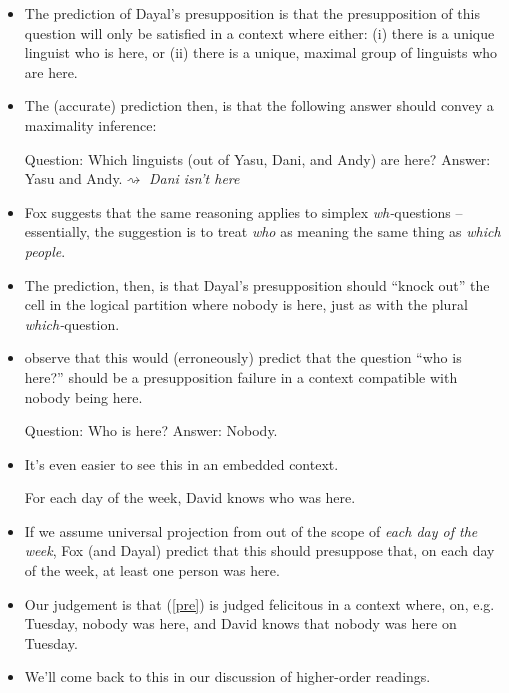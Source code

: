 \documentclass[portrait,cronos,paper=letter]{ling-handout}
\begin{document}
\begin{itemize}
        \item The prediction of Dayal's presupposition is that the
        presupposition of this question will only be satisfied in a context
        where either: (i) there is a unique linguist who is here, or (ii) there
        is a unique, maximal group of linguists who are here.

        \item The (accurate) prediction then, is that the following answer
        should convey a maximality inference:

        \pex
        \a Question: Which linguists (out of Yasu, Dani, and Andy) are here?
        \a Answer: Yasu and Andy.\hfill $⇝$ \textit{Dani isn't here}
        \xe

        \item Fox suggests that the same reasoning applies to simplex
        \textit{wh-}questions -- essentially, the suggestion is to treat
        \textit{who} as meaning the same thing as \textit{which people}.

        \item The prediction, then, is that Dayal's presupposition should \enquote{knock
        out} the cell in the logical partition where nobody is here, just as
        with the plural \textit{which-}question.

        \item \citet{elliottNicolaeSauerlandMs} observe that this would
        (erroneously) predict that the question \enquote{who is here?} should be
        a presupposition failure in a context compatible with nobody being here.

        \pex
        \a Question: Who is here?
        \a Answer: Nobody.
        \xe

      \item It's even easier to see this in an embedded context.

        \ex\label{pre}For each day of the week, David knows who was here.
        \xe

        \item If we assume universal projection from out of the scope of
        \textit{each day of the week}, Fox (and Dayal) predict that this should presuppose that, on each
        day of the week, at least
        one person was here.

        \item Our judgement is that (\ref{pre}) is judged felicitous in a
        context where, on, e.g. Tuesday, nobody was here, and David knows that
        nobody was here on Tuesday.

        \item We'll come back to this in our discussion of higher-order readings.

    \end{itemize}
\end{document}
